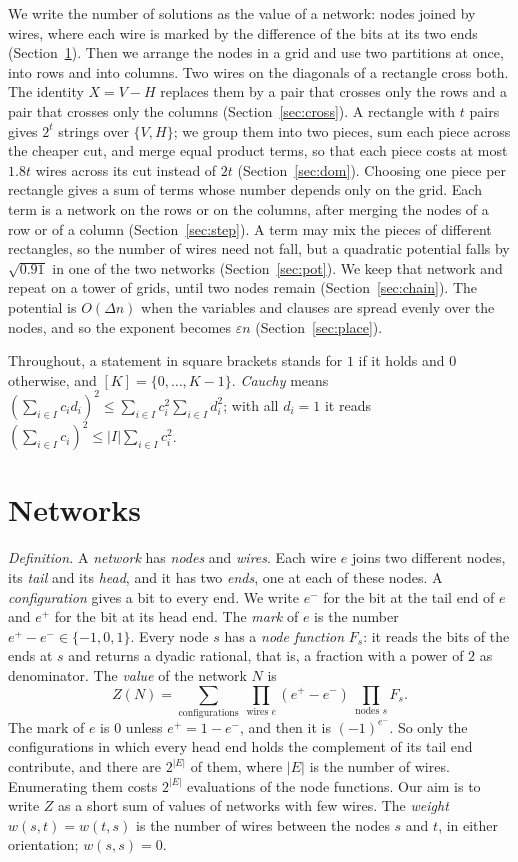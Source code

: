 \documentclass[11pt]{article}
\begin{document}
We write the number of solutions as the value of a network: nodes joined by wires, where each wire is marked by the difference of the bits at its two ends (Section~\ref{sec:net}). Then we arrange the nodes in a grid and use two partitions at once, into rows and into columns. Two wires on the diagonals of a rectangle cross both. The identity $X=V-H$ replaces them by a pair that crosses only the rows and a pair that crosses only the columns (Section~\ref{sec:cross}). A rectangle with $t$ pairs gives $2^t$ strings over $\{V,H\}$; we group them into two pieces, sum each piece across the cheaper cut, and merge equal product terms, so that each piece costs at most $1.8t$ wires across its cut instead of $2t$ (Section~\ref{sec:dom}). Choosing one piece per rectangle gives a sum of terms whose number depends only on the grid. Each term is a network on the rows or on the columns, after merging the nodes of a row or of a column (Section~\ref{sec:step}). A term may mix the pieces of different rectangles, so the number of wires need not fall, but a quadratic potential falls by $\sqrt{0.91}$ in one of the two networks (Section~\ref{sec:pot}). We keep that network and repeat on a tower of grids, until two nodes remain (Section~\ref{sec:chain}). The potential is $O(\Delta n)$ when the variables and clauses are spread evenly over the nodes, and so the exponent becomes $\varepsilon n$ (Section~\ref{sec:place}).

Throughout, a statement in square brackets stands for $1$ if it holds and $0$ otherwise, and $[K]=\{0,\dots,K-1\}$. \emph{Cauchy} means $(\sum_{i\in I}c_id_i)^2\le\sum_{i\in I}c_i^2\sum_{i\in I}d_i^2$; with all $d_i=1$ it reads $(\sum_{i\in I}c_i)^2\le|I|\sum_{i\in I}c_i^2$.

\section{Networks}\label{sec:net}

\emph{Definition.} A \emph{network} has \emph{nodes} and \emph{wires}. Each wire $e$ joins two different nodes, its \emph{tail} and its \emph{head}, and it has two \emph{ends}, one at each of these nodes. A \emph{configuration} gives a bit to every end. We write $e^-$ for the bit at the tail end of $e$ and $e^+$ for the bit at its head end. The \emph{mark} of $e$ is the number $e^+-e^-\in\{-1,0,1\}$. Every node $s$ has a \emph{node function} $F_s$: it reads the bits of the ends at $s$ and returns a dyadic rational, that is, a fraction with a power of $2$ as denominator. The \emph{value} of the network $N$ is
\[
Z(N)=\sum_{\text{configurations}}\ \prod_{\text{wires }e}(e^+-e^-)\ \prod_{\text{nodes }s}F_s .
\]
The mark of $e$ is $0$ unless $e^+=1-e^-$, and then it is $(-1)^{e^-}$. So only the configurations in which every head end holds the complement of its tail end contribute, and there are $2^{|E|}$ of them, where $|E|$ is the number of wires. Enumerating them costs $2^{|E|}$ evaluations of the node functions. Our aim is to write $Z$ as a short sum of values of networks with few wires. The \emph{weight} $w(s,t)=w(t,s)$ is the number of wires between the nodes $s$ and $t$, in either orientation; $w(s,s)=0$.
\end{document}

